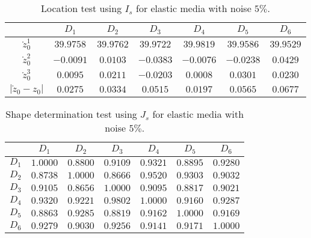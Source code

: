 \documentclass[a4paper,11pt]{article}
\theoremstyle{remark}
\theoremstyle{definition}
\numberwithin{equation}{section}
\begin{document}
\begin{table}
\hfill{}%
\begin{tabular}{|c|c|c|c|c|c|c|}
\hline
 & $D_{1}$ & $D_{2}$ & $D_{3}$ & $D_{4}$ & $D_{5}$ & $D_{6}$\tabularnewline
\hline
\hline
$\mathring{z}_{0}^{1}$ & $39.9758$ & $39.9762$ & $39.9722$ & $39.9819$ & $39.9586$ & $39.9529$\tabularnewline
\hline
$\mathring{z}_{0}^{2}$ & $-0.0091$ & $0.0103$ & $-0.0383$ & $-0.0076$ & $-0.0238$ & $0.0429$\tabularnewline
\hline
$\mathring{z}_{0}^{3}$ & $0.0095$ & $0.0211$ & $-0.0203$ & $0.0008$ & $0.0301$ & $0.0230$\tabularnewline
\hline
$\left|\mathring{z}_{0}-z_{0}\right|$ & $0.0275$ & $0.0334$ & $0.0515$ & $0.0197$ & $0.0565$ & $0.0677$\tabularnewline
\hline
\end{tabular}\hfill{}

\caption{\label{tab:location-test-medium-noise}Location test using $I_{s}$  for elastic media with noise $5\%$.}
\end{table}
\begin{table}
\hfill{}%
\begin{tabular}{|c|c|c|c|c|c|c|}
\hline
 & $D_{1}$ & $D_{2}$ & $D_{3}$ & $D_{4}$ & $D_{5}$ & $D_{6}$\tabularnewline
\hline
\hline
$D_{1}$ & $\boldsymbol{1.0000}$ & $0.8800$ & $0.9109$ & $0.9321$ & $0.8895$ & $0.9280$\tabularnewline
\hline
$D_{2}$ & $0.8738$ & $\boldsymbol{1.0000}$ & $0.8666$ & $0.9520$ & $0.9303$ & $0.9032$\tabularnewline
\hline
$D_{3}$ & $0.9105$ & $0.8656$ & $\boldsymbol{1.0000}$ & $0.9095$ & $0.8817$ & $0.9021$\tabularnewline
\hline
$D_{4}$ & $0.9320$ & $0.9221$ & $0.9802$ & $\boldsymbol{1.0000}$ & $0.9160$ & $0.9287$\tabularnewline
\hline
$D_{5}$ & $0.8863$ & $0.9285$ & $0.8819$ & $0.9162$ & $\boldsymbol{1.0000}$ & $0.9169$\tabularnewline
\hline
$D_{6}$ & $0.9279$ & $0.9030$ & $0.9256$ & $0.9141$ & $0.9171$ & $\boldsymbol{1.0000}$\tabularnewline
\hline
\end{tabular}\hfill{}

\caption{\label{tab:gesture-test-medium-noise}Shape determination test using $J_{s}$  for elastic media with noise $5\%$.}
\end{table}
\end{document}
